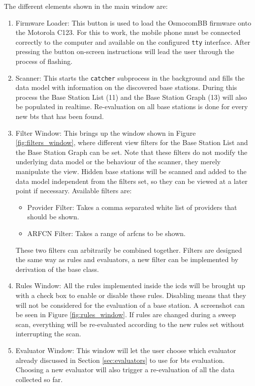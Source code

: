 The different elements shown in the main window are:
\begin{enumerate}
\item Firmware Loader: This button is used to load the OsmocomBB firmware onto the Motorola C123. 
For this to work, the mobile phone must be connected correctly to the computer and available on the configured \texttt{tty} interface.
After pressing the button on-screen instructions will lead the user through the process of flashing.

\item Scanner: This starts the \texttt{catcher} subprocess in the background and fills the data model with information on the discovered base stations.
During this process the Base Station List (11) and the Base Station Graph (13) will also be populated in realtime.
Re-evaluation on all base stations is done for every new \gls{bts} that has been found.

\item Filter Window: This brings up the window shown in Figure \ref{fig:filters_window}, where different view filters for the Base Station List and the Base Station Graph can be set.
Note that these filters do not modify the underlying data model or the behaviour of the scanner, they merely manipulate the view.
Hidden base stations will be scanned and added to the data model independent from the filters set, so they can be viewed at a later point if necessary.
Available filters are:
	\begin{itemize}
	\item Provider Filter: Takes a comma separated white list of providers that should be shown.
	\item ARFCN Filter: Takes a range of \glspl{arfcn} to be shown.
	\end{itemize}
These two filters can arbitrarily be combined together.
Filters are designed the same way as rules and evaluators, a new filter can be implemented by derivation of the base class.

\item Rules Window: All the rules implemented inside the \gls{icds} will be brought up with a check box to enable or disable these rules.
Disabling means that they will not be considered for the evaluation of a base station.
A screenshot can be seen in Figure \ref{fig:rules_window}.
If rules are changed during a sweep scan, everything will be re-evaluated according to the new rules set without interrupting the scan.

\item Evaluator Window: This window will let the user choose  which evaluator already discussed in Section \ref{sec:evaluators} to use for \gls{bts} evaluation.
Choosing a new evaluator will also trigger a re-evaluation of all the data collected so far.


\end{enumerate}
